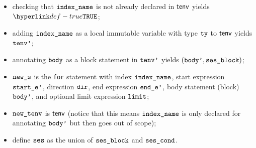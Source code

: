 \begin{itemize}
  \item checking that $\texttt{index\_name}$ is not already declared in $\textsf{tenv}$ yields $\True$\ProseOrTypeError;
  \item adding $\texttt{index\_name}$ as a local immutable variable with type $\texttt{ty}$ to $\textsf{tenv}$ yields $\texttt{tenv'}$;
  \item annotating $\texttt{body}$ as a block statement in $\texttt{tenv'}$ yields $(\texttt{body'}, \texttt{ses\_block})$\ProseOrTypeError;
  \item $\texttt{new\_s}$ is the \texttt{for} statement with index $\texttt{index\_name}$,
        start expression $\texttt{start\_e'}$, direction $\texttt{dir}$,
        end expression $\texttt{end\_e'}$,
        body statement (block) $\texttt{body'}$, and
        optional limit expression $\texttt{limit}$;
  \item $\texttt{new\_tenv}$ is $\textsf{tenv}$ (notice that this means $\texttt{index\_name}$ is only declared for annotating $\texttt{body'}$ but then goes
        out of scope);
  \item define $\texttt{ses}$ as the union of $\texttt{ses\_block}$ and $\texttt{ses\_cond}$.
\end{itemize}
\FormallyParagraph
